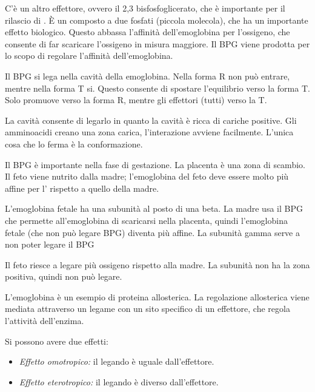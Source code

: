 C'è un altro effettore, ovvero il 2,3 bisfosfoglicerato, che è importante per il rilascio di
. È un composto a due fosfati (piccola molecola), che ha un
importante effetto biologico.
Questo abbassa l'affinità dell'emoglobina per l'ossigeno, che consente
di far scaricare l'ossigeno in misura maggiore.
Il BPG viene prodotta per lo scopo di regolare l'affinità
dell'emoglobina.


Il BPG si lega nella cavità della emoglobina. Nella forma R non può
entrare, mentre nella forma T si. Questo consente di spostare
l'equilibrio verso la forma T.
Solo  promuove verso la forma R, mentre gli effettori (tutti)
verso la T.


La cavità consente di legarlo in quanto la cavità
è ricca di cariche positive. Gli amminoacidi creano una zona carica,
l'interazione avviene facilmente.
L'unica cosa che lo ferma è la conformazione.

Il BPG è importante nella fase di gestazione. La placenta è una zona di
scambio. Il feto viene nutrito dalla madre; l'emoglobina del feto deve
essere molto più affine per l' rispetto a quello della madre.


L'emoglobina fetale ha una subunità \gamma{} al posto di una beta. La
madre usa il BPG che permette all'emoglobina di scaricarsi nella
placenta, quindi l'emoglobina fetale (che non può legare BPG) diventa
più affine.
La subunità gamma serve a non poter legare il BPG


Il feto riesce a legare più ossigeno rispetto alla madre. La subunità
\gamma{} non ha la zona positiva, quindi non può legare.


L'emoglobina è un esempio di proteina allosterica. La regolazione allosterica viene mediata attraverso un legame con un sito specifico di un effettore, che regola l'attività dell'enzima.

Si possono avere due effetti:
\begin{itemize}
   \item \emph{Effetto omotropico:} il legando è uguale dall'effettore.
   \item \emph{Effetto eterotropico:} il legando è diverso dall'effettore.
\end{itemize}

